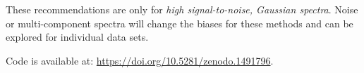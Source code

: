 \documentclass{rnaastex}
\begin{document}
These recommendations are only for {\it high signal-to-noise, Gaussian spectra}. Noise or multi-component spectra will change the biases for these methods and can be explored for individual data sets.

Code is available at: \url{https://doi.org/10.5281/zenodo.1491796}.

\end{document}
